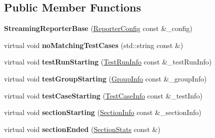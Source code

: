\subsection*{Public Member Functions}
\begin{DoxyCompactItemize}
\item 
\hypertarget{struct_catch_1_1_streaming_reporter_base_a917efb4cef0198b4f2f41f40bfda0459}{{\bfseries Streaming\-Reporter\-Base} (\hyperlink{struct_catch_1_1_reporter_config}{Reporter\-Config} const \&\-\_\-config)}\label{struct_catch_1_1_streaming_reporter_base_a917efb4cef0198b4f2f41f40bfda0459}

\item 
\hypertarget{struct_catch_1_1_streaming_reporter_base_a5f315896a20f8c67274d3587657a4c9e}{virtual void {\bfseries no\-Matching\-Test\-Cases} (std\-::string const \&)}\label{struct_catch_1_1_streaming_reporter_base_a5f315896a20f8c67274d3587657a4c9e}

\item 
\hypertarget{struct_catch_1_1_streaming_reporter_base_a0f97c112f559488dfb998c0e14bde600}{virtual void {\bfseries test\-Run\-Starting} (\hyperlink{struct_catch_1_1_test_run_info}{Test\-Run\-Info} const \&\-\_\-test\-Run\-Info)}\label{struct_catch_1_1_streaming_reporter_base_a0f97c112f559488dfb998c0e14bde600}

\item 
\hypertarget{struct_catch_1_1_streaming_reporter_base_a2731bbea2eb6150d1bed4df25c1a747b}{virtual void {\bfseries test\-Group\-Starting} (\hyperlink{struct_catch_1_1_group_info}{Group\-Info} const \&\-\_\-group\-Info)}\label{struct_catch_1_1_streaming_reporter_base_a2731bbea2eb6150d1bed4df25c1a747b}

\item 
\hypertarget{struct_catch_1_1_streaming_reporter_base_add5764ac7e0a90833d0ef601b09fc52d}{virtual void {\bfseries test\-Case\-Starting} (\hyperlink{struct_catch_1_1_test_case_info}{Test\-Case\-Info} const \&\-\_\-test\-Info)}\label{struct_catch_1_1_streaming_reporter_base_add5764ac7e0a90833d0ef601b09fc52d}

\item 
\hypertarget{struct_catch_1_1_streaming_reporter_base_a5b8de23466f372a7ebd5fe2aa01f5e39}{virtual void {\bfseries section\-Starting} (\hyperlink{struct_catch_1_1_section_info}{Section\-Info} const \&\-\_\-section\-Info)}\label{struct_catch_1_1_streaming_reporter_base_a5b8de23466f372a7ebd5fe2aa01f5e39}

\item 
\hypertarget{struct_catch_1_1_streaming_reporter_base_a6e596fd52cf2a70092fcd45a0c400989}{virtual void {\bfseries section\-Ended} (\hyperlink{struct_catch_1_1_section_stats}{Section\-Stats} const \&)}\label{struct_catch_1_1_streaming_reporter_base_a6e596fd52cf2a70092fcd45a0c400989}


\end{DoxyCompactItemize}

